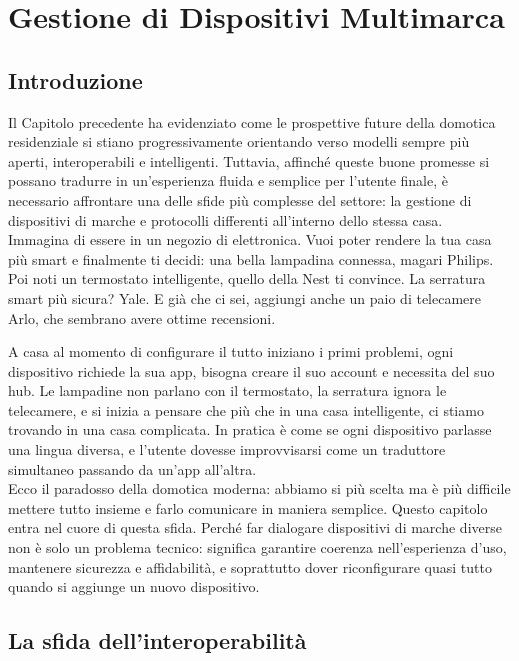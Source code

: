 
\chapter{Gestione di Dispositivi Multimarca}

\section{Introduzione}

Il Capitolo precedente ha evidenziato come le prospettive future della domotica residenziale si stiano progressivamente orientando verso modelli sempre più aperti, interoperabili e intelligenti. Tuttavia, affinché queste buone promesse si possano tradurre in un'esperienza fluida e semplice per l'utente finale, è necessario affrontare una delle sfide più complesse del settore: la gestione di dispositivi di marche e protocolli differenti all'interno dello stessa casa.\\

Immagina di essere in un negozio di elettronica. Vuoi poter rendere la tua casa più smart e finalmente ti decidi: una bella lampadina connessa, magari Philips. Poi noti un termostato intelligente, quello della Nest ti convince. La serratura smart più sicura? Yale. E già che ci sei, aggiungi anche un paio di telecamere Arlo, che sembrano avere ottime recensioni.

A casa al momento di configurare il tutto iniziano i primi problemi, ogni dispositivo richiede la sua app, bisogna creare il suo account e necessita del suo hub. Le lampadine non parlano con il termostato, la serratura ignora le telecamere, e si inizia a pensare che più che in una casa intelligente, ci stiamo trovando in una casa complicata. In pratica è come se ogni dispositivo parlasse una lingua diversa, e l'utente dovesse improvvisarsi come un traduttore simultaneo passando da un'app all'altra.\\

Ecco il paradosso della domotica moderna: abbiamo si più scelta ma è più difficile mettere tutto insieme e farlo comunicare in maniera semplice. Questo capitolo entra nel cuore di questa sfida. Perché far dialogare dispositivi di marche diverse non è solo un problema tecnico: significa garantire coerenza nell’esperienza d’uso, mantenere sicurezza e affidabilità, e soprattutto dover riconfigurare quasi tutto quando si aggiunge un nuovo dispositivo.

\section{La sfida dell'interoperabilità}

